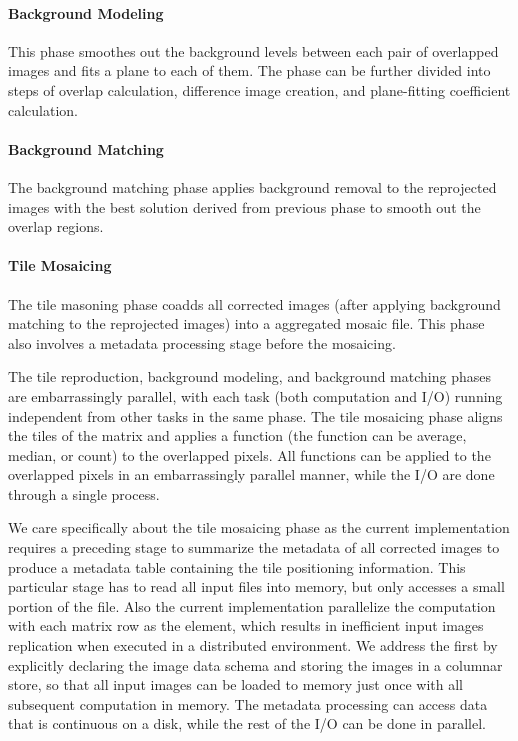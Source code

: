 \documentclass{acm_proc_article-sp}
\begin{document}
\paragraph{Background Modeling}
This phase smoothes out the background levels between each pair of overlapped images and fits a plane to each of them. The phase can be further divided into steps of overlap calculation, difference image creation, and plane-fitting coefficient calculation.

\paragraph{Background Matching}
The background matching phase applies background removal to the reprojected images with the best solution derived from previous phase to smooth out the overlap regions.

\paragraph{Tile Mosaicing}
The tile masoning phase coadds all corrected images (after applying background matching to the reprojected images) into a aggregated mosaic file. This phase also involves a metadata processing stage before the mosaicing.

The tile reproduction, background modeling, and background matching phases are embarrassingly parallel, with each task (both computation and I/O) running independent from other tasks in the same phase. The tile mosaicing phase aligns the tiles of the matrix and applies a function (the function can be average, median, or count) to the overlapped pixels. All functions can be applied to the overlapped pixels in an embarrassingly parallel manner, while the I/O are done through a single process.

We care specifically about the tile mosaicing phase as the current implementation requires a preceding stage to summarize the metadata of all corrected images to produce a metadata table containing the tile positioning information. This particular stage has to read all input files into memory, but only accesses a small portion of the file. Also the current implementation parallelize the computation with each matrix row as the element, which results in inefficient input images replication when executed in a distributed environment. We address the first by explicitly declaring the image data schema and storing the images in a columnar store, so that all input images can be loaded to memory just once with all subsequent computation in memory. The metadata processing can access data that is continuous on a disk, while the rest of the I/O can be done in parallel.
\end{document}
